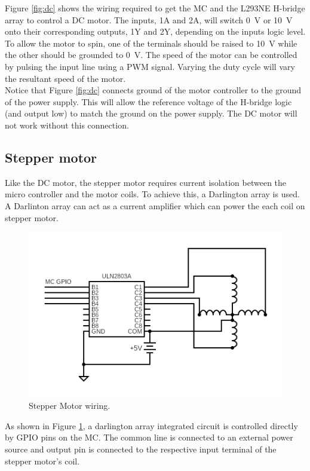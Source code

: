 \documentclass[CMPE]{../KGCOEReport}
\begin{document}
	Figure \ref{fig:dc} shows the wiring required to get the MC and the L293NE H-bridge
	array to control a DC motor. The inputs, 1A and 2A, will switch \SI{0}{\volt} or
	\SI{10}{\volt} onto their corresponding outputs, 1Y and 2Y, depending on the inputs
	logic level. To allow the motor to spin, one of the terminals should be raised to
	\SI{10}{\volt} while the other should be grounded to \SI{0}{\volt}. The speed of the
	motor can be controlled by pulsing the input line using a PWM signal. Varying the duty
	cycle will vary the resultant speed of the motor.\\

	Notice that Figure \ref{fig:dc} connects ground of the motor controller to the
	ground of the power supply. This will allow the reference voltage
	of the H-bridge logic (and output low) to match the ground on the power supply.
	The DC motor will not work without this connection.

	\subsection*{Stepper motor}

	Like the DC motor, the stepper motor requires current isolation between the micro
	controller and the motor coils. To achieve this, a Darlington array is used. A
	Darlinton array can act as a current amplifier which can power the each coil on
	stepper motor.

	\begin{figure}[ht]
	  \centering
	  \includegraphics[width=.8\linewidth]{stepper}
	  \caption{Stepper Motor wiring.}
	  \label{fig:stepper}
	\end{figure}
	
	As shown in Figure \ref{fig:stepper}, a darlington array integrated circuit is
	controlled directly by GPIO pins on the MC. The common line is connected to an
	external power source and output pin is connected to the respective input terminal
	of the stepper motor's coil.
\end{document}
